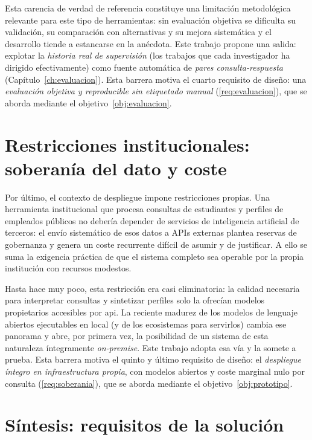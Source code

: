 Esta carencia de verdad de referencia constituye una limitación metodológica relevante para este tipo de herramientas: sin evaluación objetiva se dificulta su validación, su comparación con alternativas y su mejora sistemática y el desarrollo tiende a estancarse en la anécdota.
Este trabajo propone una salida: explotar la \emph{historia real de supervisión} (los trabajos que cada investigador ha dirigido efectivamente) como fuente automática de \emph{pares consulta-respuesta} (Capítulo~\ref{ch:evaluacion}).
Esta barrera motiva el cuarto requisito de diseño: una \emph{evaluación objetiva y reproducible sin etiquetado manual} (\ref{req:evaluacion}), que se aborda mediante el objetivo~\ref{obj:evaluacion}.

\section{Restricciones institucionales: soberanía del dato y coste}
\label{sec:problema-institucional}

Por último, el contexto de despliegue impone restricciones propias.
Una herramienta institucional que procesa consultas de estudiantes y perfiles de empleados públicos no debería depender de servicios de inteligencia artificial de terceros: el envío sistemático de esos datos a APIs externas plantea reservas de gobernanza y genera un coste recurrente difícil de asumir y de justificar.
A ello se suma la exigencia práctica de que el sistema completo sea operable por la propia institución con recursos modestos.

Hasta hace muy poco, esta restricción era casi eliminatoria: la calidad necesaria para interpretar consultas y sintetizar perfiles solo la ofrecían modelos propietarios accesibles por \gls{api}.
La reciente madurez de los modelos de lenguaje abiertos ejecutables en local (y de los ecosistemas para servirlos) cambia ese panorama y abre, por primera vez, la posibilidad de un sistema de esta naturaleza íntegramente \emph{on-premise}.
Este trabajo adopta esa vía y la somete a prueba.
Esta barrera motiva el quinto y último requisito de diseño: el \emph{despliegue íntegro en infraestructura propia}, con modelos abiertos y coste marginal nulo por consulta (\ref{req:soberania}), que se aborda mediante el objetivo~\ref{obj:prototipo}.

\section{Síntesis: requisitos de la solución}
\label{sec:problema-requisitos}

